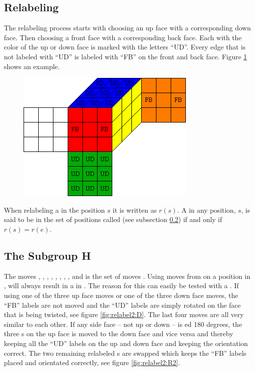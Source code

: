 \subsection{Relabeling}
The relabeling process  starts with choosing an up face with a corresponding down face. Then choosing a front face with a corresponding back face. Each \facelet{} with the color of the up or down face is marked with the letters ``UD''.  %
Every edge \cpiece{} that is not labeled with ``UD'' is labeled with ``FB'' on the front and back face.
Figure \ref{fig:relabelClean} shows an example.
\begin{figure}[!hbt]
	\centering
		\includegraphics[scale = 0.8]{input/pics/relabelClean}
	\caption{}
	\label{fig:relabelClean}
\end{figure}
When relabeling a \rubik{} in the position $s$ it is written as $r(s)$. A \rubik{} in any position, $s$, is said to be in the set of positions called  (see subsection \ref{sub:theSubgroupH}) if and only if $r(s)=r(e)$.

\subsection{The Subgroup H}
\label{sub:theSubgroupH}
The moves , , , , , , , ,  and  is the set of moves . Using moves from  on a position in , will always result in a \rubik{} in . The reason for this can easily be tested with a \rubik{}. If using one of the three up face moves or one of the three down face moves, the ``FB'' labels are not moved and the ``UD'' labels are simply rotated on the face that is being twisted, see figure \ref{fig:relabel2:D}. The last four moves are all very similar to each other. If any side face -- not up or down -- is \twist{}ed 180 degrees, the three \facelet{}s on the up face is moved to the down face and vice versa and thereby keeping all the ``UD'' labels on the up and down face and keeping the orientation correct. The two remaining relabeled \facelet{}s are swapped which keeps the ``FB'' labels placed and orientated correctly, see figure \ref{fig:relabel2:R2}.


